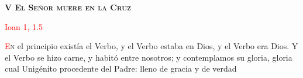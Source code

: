 \begin{center}
    \textbf{\textsc{V El Señor muere en la Cruz}}

    \textcolor{red}{Ioan 1, 1.5}
\end{center}

\lettrine[lines=2]{\textcolor{red}{E}}n el principio existía el Verbo, y el Verbo estaba en Dios, y el Verbo era Dios. Y el Verbo se hizo
carne, y habitó entre nosotros; y contemplamos su gloria, gloria cual Unigénito procedente del Padre: lleno de gracia y de verdad